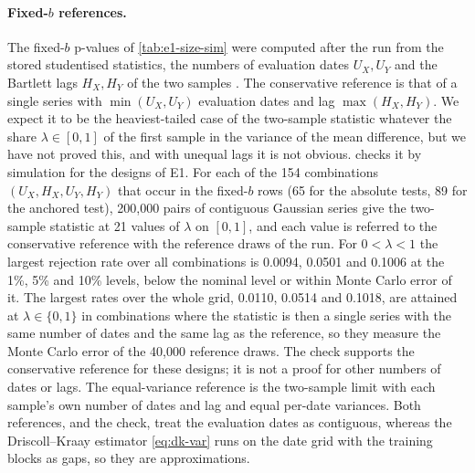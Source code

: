 \paragraph{Fixed-$b$ references.}
The fixed-$b$ p-values of \cref{tab:e1-size-sim} were computed after the run from the stored
studentised statistics, the numbers of evaluation dates $U_X,U_Y$ and the Bartlett lags $H_X,H_Y$
of the two samples \citep{kiefer_2005_new}. The conservative reference is that of a single series
with $\min(U_X,U_Y)$ evaluation dates and lag $\max(H_X,H_Y)$. We expect it to be the
heaviest-tailed case of the two-sample statistic whatever the share $\lambda\in[0,1]$ of the first
sample in the variance of the mean difference, but we have not proved this, and with unequal lags
it is not obvious.  checks it by simulation for the designs of E1. For
each of the 154 combinations $(U_X,H_X,U_Y,H_Y)$ that occur in the fixed-$b$ rows (65 for the
absolute tests, 89 for the anchored test), 200,000 pairs of contiguous \iid{} Gaussian series give
the two-sample statistic at 21 values of $\lambda$ on $[0,1]$, and each value is referred to the
conservative reference with the reference draws of the run. For $0<\lambda<1$ the largest
rejection rate over all combinations is 0.0094, 0.0501 and 0.1006 at the 1\%, 5\% and 10\% levels,
below the nominal level or within Monte Carlo error of it. The largest rates over the whole grid,
0.0110, 0.0514 and 0.1018, are attained at $\lambda\in\{0,1\}$ in combinations where the statistic
is then a single series with the same number of dates and the same lag as the reference, so they
measure the Monte Carlo error of the 40,000 reference draws. The check supports the conservative
reference for these designs; it is not a proof for other numbers of dates or lags. The
equal-variance reference is the two-sample limit with each sample's own number of dates and lag
and equal per-date variances. Both references, and the check, treat the evaluation dates as
contiguous, whereas the Driscoll--Kraay estimator \eqref{eq:dk-var} runs on the date grid with the
training blocks as gaps, so they are approximations.

